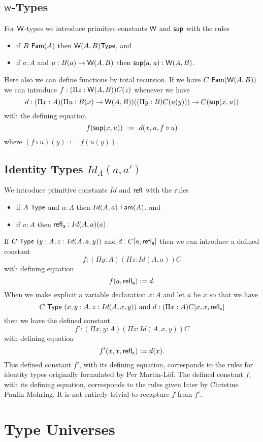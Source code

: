 \subsection*{${\sf W}$-Types}
For ${\sf W}$-types we introduce primitive constants ${\sf W}$ and ${\sf sup}$ with the rules
\begin{itemize}
\item if $B~{\sf Fam}(A)$ then ${\sf W}(A,B){\sf Type}$, and
\item if $a:A$ and $u:B(a)\rightarrow {\sf W}(A,B)$ then ${\sf sup}(a,u):{\sf W}(A,B)$.
\end{itemize}
 
 Here also we can define functions by total recursion. If we have
$C~{\sf Fam}({\sf W}(A,B))$ we can introduce $f:(\Pi z:{\sf W}(A,B))C(z)$ whenever we have
$$
d:(\Pi x:A)(\Pi u:B(x)\rightarrow {\sf W}(A,B))((\Pi y:B)C(u(y)))\rightarrow C({\sf sup}(x,u))
$$
with the defining equation
$$
f({\sf sup}(x,u)) ~:=~ d(x,u,f\circ u)
$$
where $(f\circ u)(y) ~:=~ f(u(y))$.

\subsection*{Identity Types $Id_A(a,a')$}
We introduce primitive constants $Id$ and ${\sf refl_{}}$ with the rules
\begin{itemize}
\item if $A~{\sf Type}$ and $a:A$ then $Id(A,a)~{\sf Fam}(A)$, and
\item if $a:A$ then ${\sf refl_{a}}:Id(A,a)(a)$.
\end{itemize}
If $C~{\sf Type}~(y:A,z:Id(A,a,y))$ and $d:C[a,{\sf refl_{a}}]$ then we can introduce a defined constant 
  $$f:(\Pi y:A)(\Pi z:Id(A,a))C$$ 
with defining equation
  \[ f(a,{\sf refl_{a}}):= d.\]
When we make explicit a variable declaration $x:A$ 
and let $a$ be $x$ 
so that we have 
  $$C~{\sf Type}~(x,y:A, z:Id(A,x,y))\mbox{ and  }d:(\Pi x:A)C[x,x,{\sf refl_{x}}]$$ 
then we have the defined constant
  $$f':(\Pi x,y:A)(\Pi z:Id(A,x,y))C$$ 
with defining equation
  \[ f'(x,x,{\sf refl_{x}}):= d(x).\]
This defined constant $f'$, with its defining equation, corresponds to the rules for identity types originally formulated by Per Martin-L\"{o}f.   The defined constant $f$, with its defining equation, corresponds to the rules given later by Christine Paulin-Mohring.  It is not entirely trivial to recapture $f$ from $f'$.


\section*{Type Universes}


